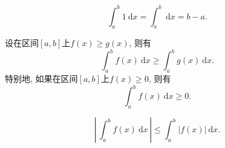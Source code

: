\documentclass[
10pt,
aspectratio=43,
]{beamer}
\begin{document}
\begin{frame}
	\begin{block}{}
		\[
			\int_a^b 1\mathrm{~d} x = \int_a^b \mathrm{~d} x= b-a.
		\]
	\end{block}
	\pause
	\begin{block}{}
		设在区间$[a,b]$上$f(x)\geq g(x)$, 则有
		\[
			\int_a^b f(x)\mathrm{~d} x \geq \int_a^b g(x)\mathrm{~d} x.
		\]
		特别地, 如果在区间$[a,b]$上$f(x)\geq 0$, 则有
		\[
			\int_a^b f(x)\mathrm{~d} x \geq 0.
		\]
	\end{block}
	\pause
	\begin{block}{}
		$$
			\left|\,\int_a^b f(x)\mathrm{~d} x\,\right| \le \int_a^b\big|f(x)\big|\mathrm{~d} x.
		$$
	\end{block}
\end{frame}
\end{document}
